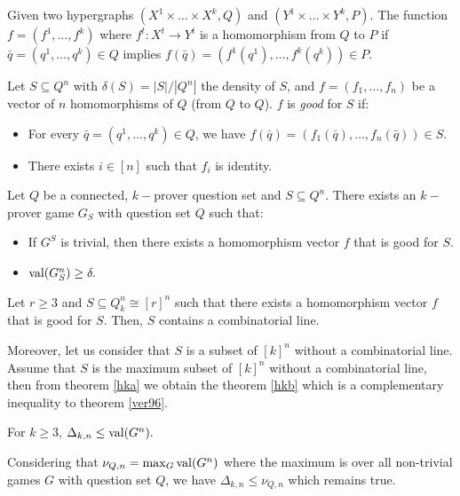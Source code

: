  Given two hypergraphs $(X^1 \times \ldots \times X^k, Q)$ and $(Y^1 \times \ldots \times Y^k, P)$. The function $f=(f^1, \ldots, f^k)$ where $f^t: X^t \longrightarrow Y^t$ is a homomorphism from $Q$ to $P$ if $\bar{q}=(q^1, \ldots,q^k) \in Q$ implies $f(\bar{q})=(f^1(q^1), \ldots,f^k(q^k)) \in P.$

Let $S\subseteq Q^n$ with $\delta(S)= |S|/|Q^n|$ the density of $S$, and $f=(f_1, \ldots, f_n)$ be a vector of $n$ homomorphisms of $Q$ (from $Q$ to $Q$). $f$ is \textit{good} for $S$ if:
\begin{itemize}
\item For every $\bar{q}=(q^1, \ldots,q^k) \in Q$, we have $f(\bar{q})=(f_1(\bar{q}), \ldots, f_n(\bar{q})) \in S.$
\item There exists $i \in  [n]$ such that $f_i$ is identity.
\end{itemize}


\begin{thm}	Let $Q$ be a connected, $k-$prover question set and $S \subseteq Q^n$. There exists an $k-$prover game $G_S$ with question set $Q$ such that:
\begin{itemize}
\item If $G^S$ is trivial, then there exists a homomorphism vector $f$ that is good for $S$.
\item $\mathrm{val} (G_S^n) \geq \delta.$
\end{itemize} \label{hhm}	\end{thm} 

\begin{pro}	Let $r \geq 3$ and $S \subseteq Q_k^n \cong [r]^n$ such that there exists a homomorphism vector $f$ that is good for $S$. Then, $S$ contains a combinatorial line.	\label{prop}\end{pro}
 
Moreover, let us consider that $S$ is a subset of $[k]^n$ without a combinatorial line. Assume that $S$ is the maximum subset of $[k]^n$ without a combinatorial line, then from theorem \eqref{hka} we obtain the theorem \eqref{hkb} which is a  complementary inequality to theorem \eqref{ver96}.
 
 \begin{thm} For $k \geq 3$, $\Delta_{k,n}	\leq \mathrm{val} (G^n).$ \label{hkb}	\end{thm}
 
 Considering that $\nu_{Q,n}=\max_G \mathrm{val} (G^n)$ where the maximum is over all non-trivial games $G$ with question set $Q$, we have $\Delta_{k,n}	\leq \nu_{Q,n}$ which remains true.
 

